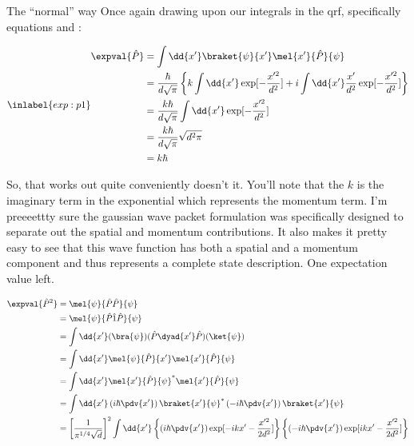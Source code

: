 \begin{answer}
\begin{answerpart}{The ``normal'' way}
    Once again drawing upon our integrals in the \ac{qrf},
    specifically equations  and
    :

    \begin{equation}
      \inlabel{exp:p1}
      \begin{split}
        \expval{\hat{P}}
        &= \int \dd{x'}
        \braket{\psi}{x'}
        \mel{x'}{\hat{P}}{\psi}
        \\
        &= \frac{\hbar}{d\sqrt{\pi}}
        \left\{
        k\int \dd{x'}
        \exp[- \frac{x'^{2}}{d^2}]
        + i\int \dd{x'}
        \frac{x'}{d^2}\exp[- \frac{x'^{2}}{d^2}]
        \right\}
        \\
        &= \frac{k\hbar}{d\sqrt{\pi}}
        \int \dd{x'}
        \exp[- \frac{x'^{2}}{d^2}]
        \\
        &= \frac{k\hbar}{d\sqrt{\pi}}
        \sqrt{d^2\pi}
        \\
        &= k\hbar
        \\
      \end{split}
    \end{equation}
    
    So, that works out quite conveniently doesn't it.  You'll note
    that the $k$ is the imaginary term in the exponential which
    represents the momentum term.  I'm preeeettty sure the gaussian
    wave packet formulation was specifically designed to separate out
    the spatial and momentum contributions.  It also makes it pretty
    easy to see that this wave function has both a spatial and a
    momentum component and thus represents a complete state
    description.  One expectation value left.

    \begin{equation}
      \begin{split}
        \expval{\hat{P}^2}
        &= \mel{\psi}{\hat{P}\hat{P}}{\psi}\\
        &= \mel{\psi}{\hat{P}\hat{1}\hat{P}}{\psi}\\
        &= \int \dd{x'} (\bra{\psi})(\hat{P}\dyad{x'}\hat{P})(\ket{\psi})\\
        &= \int \dd{x'} \mel{\psi}{\hat{P}}{x'}\mel{x'}{\hat{P}}{\psi}\\
        &= \int \dd{x'} \mel{x'}{\hat{P}}{\psi}^{*}\mel{x'}{\hat{P}}{\psi}\\
        &=
        \int \dd{x'}
        \left(i \hbar \pdv{x'}\right)
        \braket{x'}{\psi}^{*}
        \left(-i \hbar \pdv{x'}\right)
        \braket{x'}{\psi}
        \\
        &=
        \left[\frac{1}{\pi^{1/4}\sqrt{d}}\right]^2
        \int \dd{x'}
        \left\{
        \left(i \hbar \pdv{x'}\right)
        \exp[-ikx' - \frac{x'^{2}}{2d^2}]
        \right\}
        \left\{
        \left(-i \hbar \pdv{x'}\right)
        \exp[ikx' - \frac{x'^{2}}{2d^2}]        
        \right\}
        \\
      \end{split}
    \end{equation}


\end{answerpart}
\end{answer}
